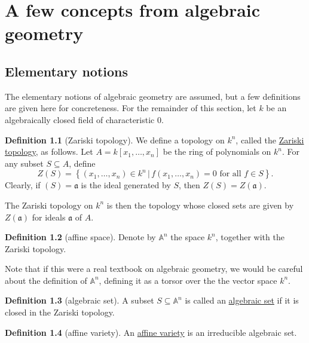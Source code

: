 \documentclass[a4paper]{report}
\newcommand{\defn}[1]{\ul{#1}}
\theoremstyle{definition}
\newtheorem{definition}{Definition}[section]
\theoremstyle{plain}
\theoremstyle{remark}
\begin{document}
\chapter{A few concepts from algebraic geometry}
\section{Elementary notions}
The elementary notions of algebraic geometry are assumed, but a few definitions are given here for concreteness. For the remainder of this section, let $k$ be an algebraically closed field of characteristic $0$.
\begin{definition}[Zariski topology]
  \label{def:zariskitopology}
  We define a topology on $k^{n}$, called the \defn{Zariski topology}, as follows. Let $A = k[x_{1},\dots,x_{n}]$ be the ring of polynomials on $k^{n}$. For any subset $S \subseteq A$, define
  \begin{equation*}
    Z(S) = \left\{ (x_{1},\dots,x_{n}) \in k^{n}\,\Big|\, f(x_{1},\dots,x_{n}) = 0\text{ for all }f \in S \right\}.
  \end{equation*}
  Clearly, if $(S) = \mathfrak{a}$ is the ideal generated by $S$, then $Z(S) = Z(\mathfrak{a})$.

  The Zariski topology on $k^{n}$ is then the topology whose closed sets are given by $Z(\mathfrak{a})$ for ideals $\mathfrak{a}$ of $A$.
\end{definition}

\begin{definition}[affine space]
  \label{def:affinespace}
  Denote by $\mathbb{A}^{n}$ the space $k^{n}$, together with the Zariski topology. 

  Note that if this were a real textbook on algebraic geometry, we would be careful about the definition of $\mathbb{A}^{n}$, defining it as a torsor over the the vector space $k^{n}$.
\end{definition} 

\begin{definition}[algebraic set]
  \label{def:algebraicset}
  A subset $S \subseteq \mathbb{A}^{n}$ is called an \defn{algebraic set} if it is closed in the Zariski topology.
\end{definition}

\begin{definition}[affine variety]
  \label{def:affinevariety}
  An \defn{affine variety} is an irreducible algebraic set.
\end{definition}
\end{document}
